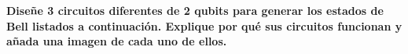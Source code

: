 \textbf{Diseñe 3 circuitos diferentes de 2 qubits para generar los estados de Bell listados
a continuación. Explique por qué sus circuitos funcionan y añada una imagen de cada uno de
ellos.}\vspace{.3cm}
